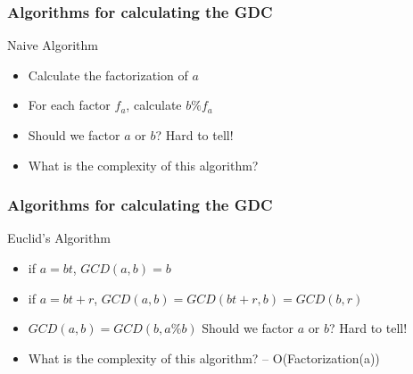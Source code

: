 \documentclass{beamer}
\begin{document}
\begin{frame}
  \frametitle{Algorithms for calculating the GDC}
  \begin{block}{Naive Algorithm}
    \begin{itemize}
    \item Calculate the factorization of $a$
    \item For each factor $f_a$, calculate $b\%f_a$
    \item Should we factor $a$ or $b$? Hard to tell!
    \item What is the complexity of this algorithm?
    \end{itemize}
  \end{block}
\end{frame}
\begin{frame}
  \frametitle{Algorithms for calculating the GDC}
  \begin{block}{Euclid's Algorithm}
    \begin{itemize}
    \item if $a = bt$, $GCD(a,b) = b$
    \item if $a = bt+r$, $GCD(a,b) = GCD(bt+r,b) = GCD(b,r)$
    \item $GCD(a,b) = GCD(b,a\%b)$ Should we factor $a$ or $b$? Hard to tell!
    \item What is the complexity of this algorithm? -- O(Factorization(a))
    \end{itemize}
  \end{block}
\end{frame}
\end{document}
